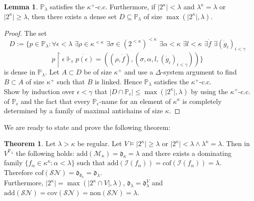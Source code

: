 \documentclass[12pt,a4paper]{scrartcl}
\theoremstyle{definition}
\newtheorem{theorem}[definition]{Theorem}
\newtheorem{lemma}[definition]{Lemma}
\numberwithin{equation}{section}
\begin{document}
\begin{lemma}
$\mathbb{P}_\lambda$ satisfies the $\kappa^+$-c.c. Furthermore, if $\vert 2^\kappa\vert <\lambda$ and $\lambda^\kappa= \lambda$ or $\vert2^\kappa\vert \geq \lambda$, then there exists a dense set $D \subseteq \mathbb{P}_\lambda$ of size $\max(\vert2^\kappa \vert,\lambda)$.
\end{lemma}

\begin{proof}
The set $$D:=\{p \in \mathbb{P}_\lambda \colon \forall \epsilon < \lambda \, \, \exists \rho \in \kappa^{<\kappa} \,\, \exists \sigma \in (2^{<\kappa})^{<\kappa} \,\,  \exists \alpha < \kappa \,\, \exists l < \kappa \,\, \exists \dot{f} \,\, \exists (\dot{g}_i)_{i<\gamma} $$ $$p \restriction \epsilon \Vdash_\epsilon  \dot{p(\epsilon)}=((\rho, \dot{f}),(\sigma, \alpha, l, (\dot{g}_i)_{i<\gamma}))\}$$
is dense in $\mathbb{P}_\lambda$. Let $A\subset D$ be of size $\kappa^+$ and use a $\Delta$-system argument to find $B \subset A$ of size $\kappa^+$ such that $B$ is linked. Hence $\mathbb{P}_\lambda$ satisfies the $\kappa^+$-c.c.\\
Show by induction over $\epsilon < \gamma$ that $\vert D \cap \mathbb{P}_\epsilon\vert \leq \max(\vert 2^\kappa \vert,\lambda)$ by using the $\kappa^+$-c.c. of $\mathbb{P}_\epsilon$ and the fact that every $\mathbb{P}_\epsilon$-name for an element of $\kappa^\kappa$ is completely determined by a family of maximal antichains of size $\kappa$.
\end{proof}

We are ready to state and prove the following theorem:

\begin{theorem}
Let $\lambda > \kappa$ be regular. Let $V \vDash \vert 2^\kappa\vert \geq \lambda \,\, \text{or} \,\, \vert2^\kappa\vert < \lambda \land \lambda^\kappa=\lambda$. Then in $V^{\mathbb{P}_\lambda}$ the following holds: $\text{add}(\mathcal{M}_\kappa)=\mathfrak{d}_\kappa= \lambda$ and there exists a dominating family $\{f_\alpha \in \kappa^\kappa \colon \alpha < \lambda\}$ such that $\text{add}(\mathcal{I}(f_\alpha))=\text{cof}(\mathcal{I}(f_\alpha)) =\lambda$. Therefore $\text{cof}(\mathcal{SN})=\mathfrak{d}_{\mathfrak{d}_\kappa}= \mathfrak{d}_\lambda$.\\
Furthermore, $\vert 2^\kappa\vert =\max(\vert 2^\kappa \cap V \vert, \lambda)$, $\mathfrak{d}_\lambda=\mathfrak{d}_\lambda^V$ and $\text{add}(\mathcal{SN})= \text{cov}(\mathcal{SN})=\text{non}(\mathcal{SN})=\lambda$.
\end{theorem}
\end{document}
